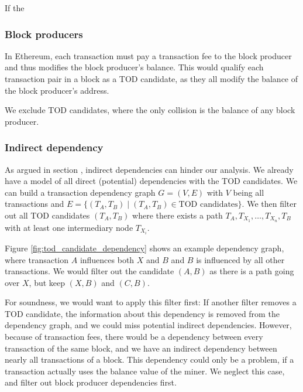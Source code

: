 \documentclass[draft,final]{vutinfth} %
\begin{document}
If the

\subsubsection{Block producers}

In Ethereum, each transaction must pay a transaction fee to the block producer and thus modifies the block producer's balance. This would qualify each transaction pair in a block as a TOD candidate, as they all modify the balance of the block producer's address.

We exclude TOD candidates, where the only collision is the balance of any block producer.


\subsubsection{Indirect dependency}

\iffalse
    The overall goal of our analysis, is to analyze the effects of the transaction order. For this, we will take a TOD candidate $(T_A, T_B)$ and analyze what would have happened if they were executed in the opposite order, i.e. $(T_B, T_A)$.
\fi

As argued in section , indirect dependencies can hinder our analysis. We already have a model of all direct (potential) dependencies with the TOD candidates. We can build a transaction dependency graph $G = (V, E)$ with $V$ being all transactions and $E = \{ (T_A, T_B) \mid (T_A, T_B) \in \text{TOD candidates} \}$. We then filter out all TOD candidates $(T_A, T_B)$ where there exists a path $T_A, T_{X_1}, \dots, T_{X_n}, T_B$ with at least one intermediary node $T_{X_i}$.

Figure \ref{fig:tod_candidate_dependency} shows an example dependency graph, where transaction $A$ influences both $X$ and $B$ and $B$ is influenced by all other transactions. We would filter out the candidate $(A, B)$ as there is a path going over $X$, but keep $(X, B)$ and $(C, B)$.

For soundness, we would want to apply this filter first: If another filter removes a TOD candidate, the information about this dependency is removed from the dependency graph, and we could miss potential indirect dependencies. However, because of transaction fees, there would be a dependency between every transaction of the same block, and we have an indirect dependency between nearly all transactions of a block. This dependency could only be a problem, if a transaction actually uses the balance value of the miner. We neglect this case, and filter out block producer dependencies first.
\end{document}

